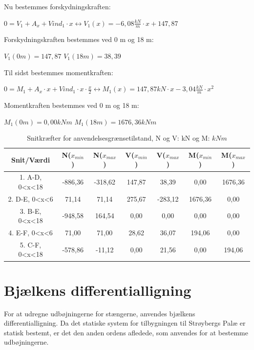 Nu bestemmes forskydningskraften:
\begin{center}
	$0 = V_1 + A_x + Vind_1 \cdot x \leftrightarrow V_1(x) = -6,\!08 \frac{kN}{m} \cdot x + 147,\!87$
\end{center}

Forskydningskraften bestemmes ved 0 m og 18 m:
\begin{center}
	$V_1(0m) = 147,\!87$
	\newline
	$V_1(18m) = 38,\!39$
\end{center}

Til sidst bestemmes momentkraften:
\begin{center}
	$0 = M_1 + A_x \cdot x + Vind_1\cdot x\cdot \frac{x}{2} \leftrightarrow M_1(x) = 147,\!87 kN\cdot x - 3,\!04 \frac{kN}{m}\cdot x^2$
\end{center}

Momentkraften bestemmes ved 0 m og 18 m:
\begin{center}
	$M_1(0m) = 0,\!00 kNm$
	\newline
	$M_1(18m) = 1676,\!36 kNm$
\end{center}

\begin{table}
	\begin{center}
		\begin{tabular}{|c|c|c|c|c|c|c|}
			\hline
			Snit/Værdi & N($x_{min}$) & N($x_{max}$) & V($x_{min}$) & V($x_{max}$) & M($x_{min}$) & M($x_{max}$) 	\\ \hline
			1. A-D, 0<x<18 	& -886,36 	& -318,62 	&  147,87 	&  38,39 	&  0,00     &  1676,36        		\\ \hline
			2. D-E, 0<x<6  	&  71,14    &  71,14    &  275,67   & -283,12   &  1676,36  &  0,00    \\ \hline
			3. B-E, 0<x<18  & -948,58   &  164,54   &  0,00     &  0,00     &  0,00     &  0,00 			    \\ \hline
			4. E-F, 0<x<6   &  71,00    &  71,00    &  28,62    &  36,07    &  194,06   &  0,00     \\ \hline
			5. C-F, 0<x<18     & -578,86   & -11,12    &  0,00     &  21,56    &  0,00     &  194,06       		\\ \hline
		\end{tabular}
		\caption{Snitkræfter for anvendelsesgrænsetilstand, N og V: kN og M: $kNm$}
		\label{tab:anden2}
	\end{center}
\end{table}

\section{Bjælkens differentialligning}
For at udregne udbøjningerne for stængerne, anvendes bjælkens differentialligning. Da det statiske system for tilbygningen til Strøybergs Palæ er statisk bestemt, er det den anden ordens afledede, som anvendes for at bestemme udbøjningerne.